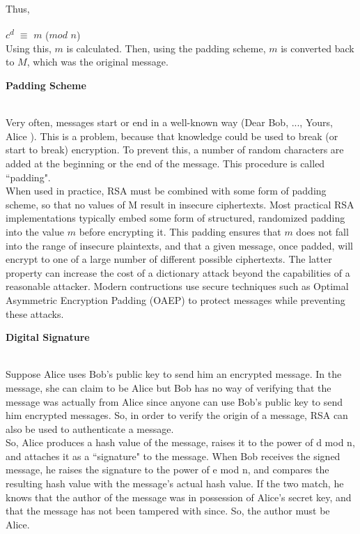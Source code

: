 \documentclass[12 pt]{article}
\begin{document}
{Thus, \bigskip

$c$\textsuperscript{$d$} $\equiv$ $m$ \hspace{66 pt} ($mod$ $n$)
\\[10 pt]

\noindent Using this, $m$ is calculated. Then, using the padding scheme, $m$ is converted back to $M$, which was the original message.
\pagebreak

\begin{LARGE}
\noindent \textbf{Padding Scheme}
\end{LARGE}\\[12 pt]

\noindent Very often, messages start or end in a well-known way (Dear Bob, ..., Yours, Alice ). This is a problem, because that knowledge could be used to break (or start to break) encryption. To prevent this, a number of random characters are added at the beginning or the end of the message. This procedure is called ``padding".
\\

\noindent When used in practice, RSA must be combined with some form of padding scheme, so that no values of M result in insecure ciphertexts. Most practical RSA implementations typically embed some form of structured, randomized padding into the value $m$ before encrypting it. This padding ensures that $m$ does not fall into the range of insecure plaintexts, and that a given message, once padded, will encrypt to one of a large number of different possible ciphertexts. The latter property can increase the cost of a dictionary attack beyond the capabilities of a reasonable attacker. Modern contructions use secure techniques such as Optimal Asymmetric Encryption Padding (OAEP) to protect messages while preventing these attacks. \\[16.18pt]

\begin{LARGE}
\noindent \textbf{Digital Signature}
\end{LARGE}\\[12 pt]

\noindent Suppose Alice uses Bob's public key to send him an encrypted message. In the message, she can claim to be Alice but Bob has no way of verifying that the message was actually from Alice since anyone can use Bob's public key to send him encrypted messages. So, in order to verify the origin of a message, RSA can also be used to authenticate a message.\\

\noindent So, Alice produces a hash value of the message, raises it to the power of d mod n, and attaches it as a ``signature" to the message. When Bob receives the signed message, he raises the signature to the power of e mod n, and compares the resulting hash value with the message's actual hash value. If the two match, he knows that the author of the message was in possession of Alice's secret key, and that the message has not been tampered with since. So, the author must be Alice.

}
\end{document}
